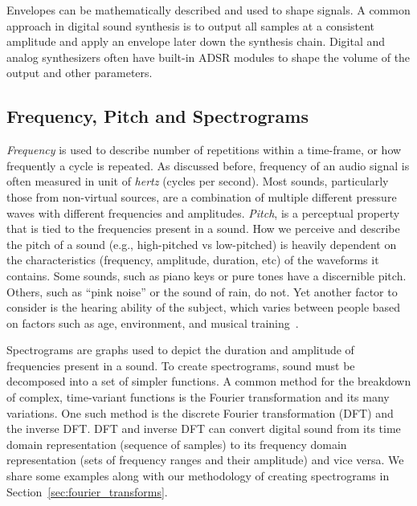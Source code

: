 \documentclass[\main/thesis.tex]{subfiles}
\begin{document}
Envelopes can be mathematically described and used to shape signals. A common approach in digital sound synthesis is to output all samples at a consistent amplitude and apply an envelope later down the synthesis chain. Digital and analog synthesizers often have built-in ADSR modules to shape the volume of the output and other parameters.  

\subsection{Frequency, Pitch and Spectrograms}
\textit{Frequency} is used to describe number of repetitions within a time-frame, or how frequently a cycle is repeated. As discussed before, frequency of an audio signal is often measured in unit of \textit{hertz} (cycles per second). Most sounds, particularly those from non-virtual sources, are a combination of multiple different pressure waves with different frequencies and amplitudes. \textit{Pitch}, is a perceptual property that is tied to the frequencies present in a sound. How we perceive and describe the pitch of a sound (e.g., high-pitched vs low-pitched) is heavily dependent on the characteristics (frequency, amplitude, duration, etc) of the waveforms it contains. Some sounds, such as piano keys or pure tones have a discernible pitch. Others, such as \enquote{pink noise} or the sound of rain, do not. Yet another factor to consider is the hearing ability of the subject, which varies between people based on factors such as age, environment, and musical training~\cite{reiss2016meta,alain2007age,newman2012grm7}. 

Spectrograms are graphs used to depict the duration and amplitude of frequencies present in a sound. To create spectrograms, sound must be decomposed into a set of simpler functions. A common method for the breakdown of complex, time-variant functions is the Fourier transformation and its many variations. One such method is the discrete Fourier transformation (DFT) and the inverse DFT. DFT and inverse DFT can convert digital sound from its time domain representation (sequence of samples) to its frequency domain representation (sets of frequency ranges and their amplitude) and vice versa. We share some examples along with our methodology of creating spectrograms in Section~\ref{sec:fourier_transforms}.\\\\
\end{document}
